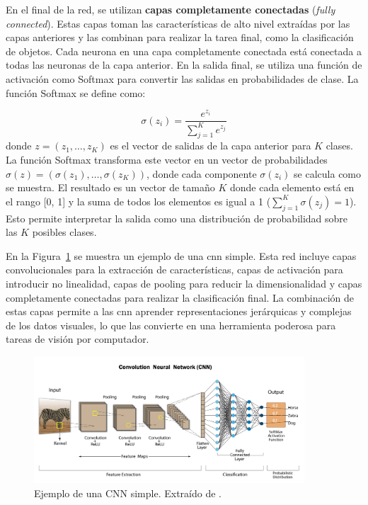 \documentclass[11pt,spanish,listoffigures,listoftables]{tfgetsinf}
\begin{document}
En el final de la red, se utilizan \textbf{capas completamente conectadas} (\textit{fully connected}). Estas capas toman las características de alto nivel extraídas por las capas anteriores y las combinan para realizar la tarea final, como la clasificación de objetos. Cada neurona en una capa completamente conectada está conectada a todas las neuronas de la capa anterior. En la salida final, se utiliza una función de activación como Softmax para convertir las salidas en probabilidades de clase. La función Softmax se define como:

\begin{equation}
   \sigma(z_i) = \frac{e^{z_i}}{\sum_{j=1}^{K} e^{z_j}}
\end{equation}
donde $z = (z_1, \dots, z_K)$ es el vector de salidas de la capa anterior para $K$ clases. La función Softmax transforma este vector en un vector de probabilidades $\sigma(z) = (\sigma(z_1), \dots, \sigma(z_K))$, donde cada componente $\sigma(z_i)$ se calcula como se muestra. El resultado es un vector de tamaño $K$ donde cada elemento está en el rango [0, 1] y la suma de todos los elementos es igual a 1 ($\sum_{j=1}^{K} \sigma(z_j) = 1$). Esto permite interpretar la salida como una distribución de probabilidad sobre las $K$ posibles clases.

En la Figura~\ref{fig:cnn_example} se muestra un ejemplo de una \gls{cnn} simple. Esta red incluye capas convolucionales para la extracción de características, capas de activación para introducir no linealidad, capas de pooling para reducir la dimensionalidad y capas completamente conectadas para realizar la clasificación final. La combinación de estas capas permite a las \gls{cnn} aprender representaciones jerárquicas y complejas de los datos visuales, lo que las convierte en una herramienta poderosa para tareas de visión por computador.

\begin{figure}[H]
   \centering
   \includegraphics[width=0.9\textwidth]{images/estado_del_arte/cnn_example.png}
   \caption[Ejemplo de una CNN simple]{Ejemplo de una CNN simple. Extraído de \cite{devbreachCNN}.}
   \label{fig:cnn_example}
\end{figure}
\end{document}
